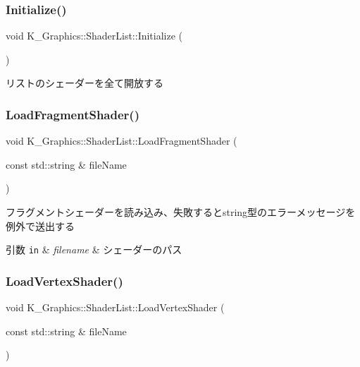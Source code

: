 \subsubsection{\texorpdfstring{Initialize()}{Initialize()}}
{\footnotesize\ttfamily void K\+\_\+\+Graphics\+::\+Shader\+List\+::\+Initialize (\begin{DoxyParamCaption}{ }\end{DoxyParamCaption})}



リストのシェーダーを全て開放する 

\mbox{\label{class_k___graphics_1_1_shader_list_a5daf641dfbc9472b9fb37126cfad27c7}} 
\subsubsection{\texorpdfstring{Load\+Fragment\+Shader()}{LoadFragmentShader()}}
{\footnotesize\ttfamily void K\+\_\+\+Graphics\+::\+Shader\+List\+::\+Load\+Fragment\+Shader (\begin{DoxyParamCaption}\item[{const std\+::string \&}]{file\+Name }\end{DoxyParamCaption})}



フラグメントシェーダーを読み込み、失敗するとstring型のエラーメッセージを例外で送出する 


\begin{DoxyParams}[1]{引数}
\mbox{\tt in}  & {\em filename} & シェーダーのパス \\
\hline
\end{DoxyParams}
\mbox{\label{class_k___graphics_1_1_shader_list_a5caa3b1fa44d6f4459e0471ead6c87e0}} 
\subsubsection{\texorpdfstring{Load\+Vertex\+Shader()}{LoadVertexShader()}}
{\footnotesize\ttfamily void K\+\_\+\+Graphics\+::\+Shader\+List\+::\+Load\+Vertex\+Shader (\begin{DoxyParamCaption}\item[{const std\+::string \&}]{file\+Name }\end{DoxyParamCaption})}



